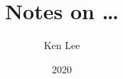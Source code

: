 \documentclass{article}
\begin{document}
\title{Notes on \dots}

\author{Ken Lee}
\date{2020}
\maketitle


\end{document}
